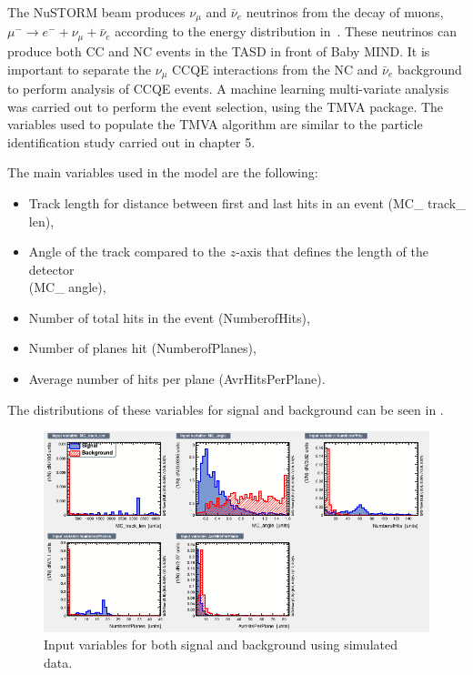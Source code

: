 The NuSTORM beam produces $\nu_\mu$ and $\bar{\nu}_e$ neutrinos from the decay of muons, $ \mu^- \rightarrow e^- + \nu_\mu + \bar{\nu}_e $ according to the energy distribution in~. These neutrinos can produce both CC and NC events in the TASD in front of Baby MIND. It is important to separate the $\nu_\mu$ CCQE interactions from the NC and $\bar{\nu}_e$ background to perform analysis of CCQE events. A machine learning multi-variate analysis was carried out to perform the event selection, using the TMVA package. The variables used to populate the TMVA algorithm are similar to the particle identification study carried out in chapter 5.


The main variables used in the model are the following:
\begin{itemize}
\item Track length for distance between first and last hits in an event (MC\_ track\_ len),
\item Angle of the track compared to the $z$-axis that defines the length of the detector\\ (MC\_ angle),
\item Number of total hits in the event (NumberofHits),
\item Number of planes hit (NumberofPlanes),
\item Average number of hits per plane (AvrHitsPerPlane).
\end{itemize}

The distributions of these variables for signal and background can be seen in .


\begin{figure}[h!]
\centering

\includegraphics[width=\textwidth]{figures/neutrinoTMVA/variables_id_c1.png}
\caption{Input variables for both signal and background using simulated data.}
\label{fig:TMVANeuinput}
\end{figure}

